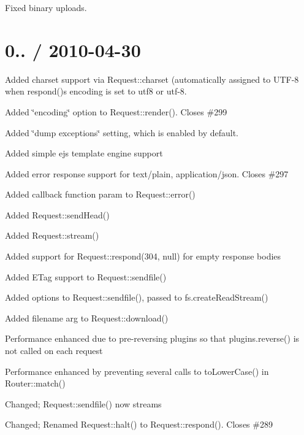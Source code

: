 {\ttfamily }

{\ttfamily 
\begin{DoxyItemize}
\item Fixed binary uploads.
\end{DoxyItemize}}

{\ttfamily \section*{0.. / 2010-\/04-\/30 }}

{\ttfamily }

{\ttfamily 
\begin{DoxyItemize}
\item Added charset support via Request\+::charset (automatically assigned to \textquotesingle{}U\+T\+F-\/8\textquotesingle{} when respond()\textquotesingle{}s encoding is set to \textquotesingle{}utf8\textquotesingle{} or \textquotesingle{}utf-\/8\textquotesingle{}.
\item Added \char`\"{}encoding\char`\"{} option to Request\+::render(). Closes \#299
\item Added \char`\"{}dump exceptions\char`\"{} setting, which is enabled by default.
\item Added simple ejs template engine support
\item Added error response support for text/plain, application/json. Closes \#297
\item Added callback function param to Request\+::error()
\item Added Request\+::send\+Head()
\item Added Request\+::stream()
\item Added support for Request\+::respond(304, null) for empty response bodies
\item Added E\+Tag support to Request\+::sendfile()
\item Added options to Request\+::sendfile(), passed to fs.\+create\+Read\+Stream()
\item Added filename arg to Request\+::download()
\item Performance enhanced due to pre-\/reversing plugins so that plugins.\+reverse() is not called on each request
\item Performance enhanced by preventing several calls to to\+Lower\+Case() in Router\+::match()
\item Changed; Request\+::sendfile() now streams
\item Changed; Renamed Request\+::halt() to Request\+::respond(). Closes \#289

\end{DoxyItemize}}
